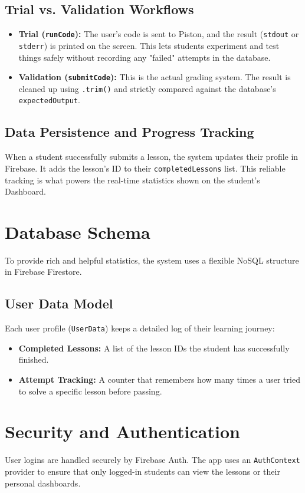 \documentclass[12pt]{report}
\begin{document}
\subsection{Trial vs. Validation Workflows}
\begin{itemize}
    \item \textbf{Trial (\texttt{runCode}):} The user's code is sent to Piston, and the result (\texttt{stdout} or \texttt{stderr}) is printed on the screen. This lets students experiment and test things safely without recording any "failed" attempts in the database.
    \item \textbf{Validation (\texttt{submitCode}):} This is the actual grading system. The result is cleaned up using \texttt{.trim()} and strictly compared against the database's \texttt{expectedOutput}. 
\end{itemize}

\subsection{Data Persistence and Progress Tracking}
When a student successfully submits a lesson, the system updates their profile in Firebase. It adds the lesson's ID to their \texttt{completedLessons} list. This reliable tracking is what powers the real-time statistics shown on the student's Dashboard.

\section{Database Schema}
To provide rich and helpful statistics, the system uses a flexible NoSQL structure in Firebase Firestore.

\subsection{User Data Model}
Each user profile (\texttt{UserData}) keeps a detailed log of their learning journey:
\begin{itemize}
\item \textbf{Completed Lessons:} A list of the lesson IDs the student has successfully finished.
\item \textbf{Attempt Tracking:} A counter that remembers how many times a user tried to solve a specific lesson before passing.
\end{itemize}

\section{Security and Authentication}
User logins are handled securely by Firebase Auth. The app uses an \texttt{AuthContext} provider to ensure that only logged-in students can view the lessons or their personal dashboards.
\end{document}
